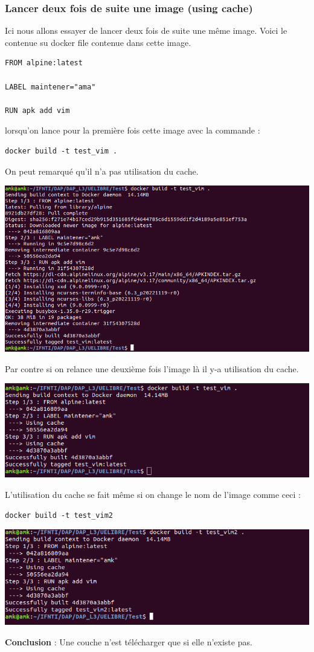 \documentclass[12pt,a4paper]{article}
\begin{document}
\subsubsection{Lancer deux fois de suite une image (using cache)}
Ici nous allons essayer de lancer deux fois de suite une même image. Voici 
le contenue su docker file contenue dans cette image.
\begin{verbatim}
FROM alpine:latest

LABEL maintener="ama"

RUN apk add vim
\end{verbatim}
lorsqu'on lance pour la première fois cette image avec la commande :
\begin{verbatim}
docker build -t test_vim .
\end{verbatim}
On peut remarqué qu'il n'a pas utilisation du cache.
\begin{center}
\includegraphics[scale=0.3]{img/test_vim.png}
\end{center}
Par contre si on relance une deuxième fois l'image là il y-a utilisation du cache.
\begin{center}
\includegraphics[scale=0.3]{img/test_vim_cache.png}
\end{center}
L'utilisation du cache se fait même si on change le nom de l'image comme ceci :
\begin{verbatim}
docker build -t test_vim2
\end{verbatim}
\begin{center}
\includegraphics[scale=0.3]{img/test_vim3.png}
\end{center}
\textbf{Conclusion } : Une couche n'est télécharger que si elle n'existe pas.
\end{document}
